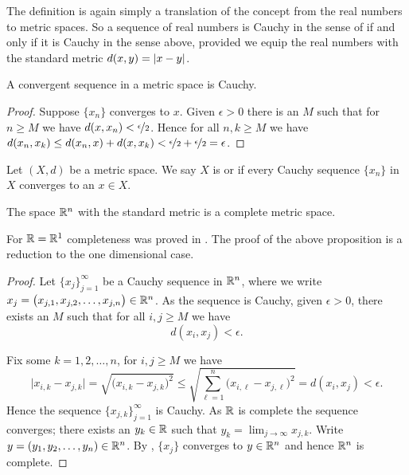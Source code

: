 The definition is again simply a translation of the concept
from the real numbers to metric spaces.  So a sequence of real
numbers is Cauchy in the sense of  if and only if
it is Cauchy in the sense above, provided we equip the real numbers with
the standard metric $d(x,y) = \left\lvert {x-y} \right\rvert$.

\begin{prop}
A convergent sequence in a metric space is Cauchy.
\end{prop}

\begin{proof}
Suppose $\{ x_n \}$ converges to $x$.
Given $\epsilon > 0$ there is an $M$ such that for $n \geq M$
we have $d(x,x_n) < \nicefrac{\epsilon}{2}$.  Hence
for all $n,k \geq M$ we have
$d(x_n,x_k) \leq d(x_n,x) + d(x,x_k) < \nicefrac{\epsilon}{2} +
\nicefrac{\epsilon}{2} = \epsilon$.
\end{proof}

\begin{defn}
Let $(X,d)$ be a metric space.  We say $X$ is
\emph{} or \emph{}
if every Cauchy sequence $\{ x_n \}$ in $X$
converges to an $x \in X$.
\end{defn}

\begin{prop}
The space ${\mathbb{R}}^n$ with the standard metric is a complete metric space.
\end{prop}

For ${\mathbb{R}} = {\mathbb{R}}^1$ completeness was proved in .  The proof of
the above proposition is a reduction to the one dimensional case.

\begin{proof}
Let $\{ x_j \}_{j=1}^\infty$ be a Cauchy sequence
in ${\mathbb{R}}^n$, where we write $x_j = \bigl(x_{j,1},x_{j,2},\ldots,x_{j,n}\bigr) \in {\mathbb{R}}^n$.
As the sequence is Cauchy, given $\epsilon > 0$, there exists an $M$ such that for all
$i,j \geq M$ we have
\begin{equation*}
d(x_i,x_j) < \epsilon.
\end{equation*}

Fix some $k=1,2,\ldots,n$, for $i,j \geq M$ we have
\begin{equation*}
\bigl\lvert x_{i,k} - x_{j,k} \bigr\rvert
=
\sqrt{{\bigl(x_{i,k} - x_{j,k}\bigr)}^2}
\leq
\sqrt{\sum_{\ell=1}^n {\bigl(x_{i,\ell}-x_{j,\ell}\bigr)}^2}
= d(x_i,x_j) < \epsilon .
\end{equation*}
Hence the sequence $\{ x_{j,k} \}_{j=1}^\infty$ is Cauchy.  As ${\mathbb{R}}$ is
complete the sequence converges; there exists an $y_k \in {\mathbb{R}}$ such that
$y_k = \lim_{j\to\infty} x_{j,k}$.
Write $y = (y_1,y_2,\ldots,y_n) \in {\mathbb{R}}^n$.
By , $\{ x_j \}$ converges
to $y \in {\mathbb{R}}^n$ and hence ${\mathbb{R}}^n$ is complete.
\end{proof}

